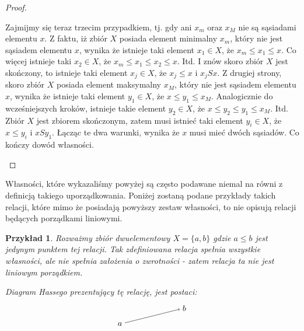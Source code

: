 \documentclass[12pt,a4paper]{report}
\newtheorem{example}{Przykład}
\begin{document}
\begin{proof}
\begin{enumerate}
\begin{itemize}
Zajmijmy się teraz trzecim przypadkiem, tj. gdy ani $x_m$ oraz $x_M$ nie są sąsiadami elementu $x$. Z faktu, iż zbiór $X$ posiada element minimalny $x_m$, który nie jest sąsiadem elementu $x$, wynika że istnieje taki element $x_1 \in X$, że $x_m \leq x_1 \leq x$. Co więcej istnieje taki $x_2 \in X$, że $x_m \leq x_1 \leq x_2 \leq x.$ Itd. I znów skoro zbiór $X$ jest skończony, to istnieje taki element $x_j \in X$, że $x_j \leq x$ i $x_jSx$. Z drugiej strony, skoro zbiór $X$ posiada element maksymalny $x_M$, który nie jest sąsiadem elementu $x$, wynika że istnieje taki element $y_1 \in X$, że $x \leq y_1 \leq x_M$. Analogicznie do wcześniejszych kroków, istnieje takie element $y_2 \in X$, że $x \leq y_2 \leq y_1 \leq x_M$. Itd.  Zbiór $X$ jest zbiorem skończonym, zatem musi istnieć taki element $y_i \in X$, że $x \leq y_i$ i $xSy_1$. 
Łącząc te dwa warunki, wynika że $x$ musi mieć dwóch sąsiadów. Co kończy dowód własności.

\end{itemize}

\end{enumerate}
\end{proof}

Własności, które wykazaliśmy powyżej są często podawane niemal na równi z definicją takiego uporządkowania. Poniżej zostaną  podane przykłady takich relacji, które mimo że posiadają powyższy zestaw własności, to nie opisują relacji będących porządkami liniowymi. 
 
\begin{example}
Rozważmy zbiór dwuelementowy $X = \{ a, b \}$ gdzie $a \leq b$ jest jedynym punktem tej relacji. Tak zdefiniowana relacja spełnia wszystkie własności, ale nie spełnia założenia o zwrotności - zatem relacja ta nie jest liniowym porządkiem.
 
Diagram Hassego prezentujący tę relację, jest postaci: 
$$
\begin{tikzpicture}[scale=.7]
  \node (a) at (-2,0) {$a$};
  \node (b) at (2,1) {$b$};
  \draw [->](a)--(b) ;
\end{tikzpicture}
$$
\end{example}
\end{document}

